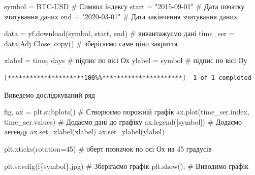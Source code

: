 \documentclass[
  letterpaper,
]{report}
\newenvironment{Shaded}{\begin{snugshade}}{\end{snugshade}}
\newcommand{\CommentTok}[1]{\textcolor[rgb]{0.37,0.37,0.37}{#1}}
\newcommand{\DecValTok}[1]{\textcolor[rgb]{0.68,0.00,0.00}{#1}}
\newcommand{\NormalTok}[1]{\textcolor[rgb]{0.00,0.23,0.31}{#1}}
\newcommand{\OperatorTok}[1]{\textcolor[rgb]{0.37,0.37,0.37}{#1}}
\newcommand{\SpecialCharTok}[1]{\textcolor[rgb]{0.37,0.37,0.37}{#1}}
\newcommand{\SpecialStringTok}[1]{\textcolor[rgb]{0.13,0.47,0.30}{#1}}
\newcommand{\StringTok}[1]{\textcolor[rgb]{0.13,0.47,0.30}{#1}}
\begin{document}
\begin{Shaded}
\begin{Highlighting}[]
\NormalTok{symbol }\OperatorTok{=} \StringTok{\textquotesingle{}BTC{-}USD\textquotesingle{}}       \CommentTok{\# Символ індексу}
\NormalTok{start }\OperatorTok{=} \StringTok{"2015{-}09{-}01"}     \CommentTok{\# Дата початку зчитування даних}
\NormalTok{end }\OperatorTok{=} \StringTok{"2020{-}03{-}01"}       \CommentTok{\# Дата закінчення зчитування даних}

\NormalTok{data }\OperatorTok{=}\NormalTok{ yf.download(symbol, start, end)  }\CommentTok{\# вивантажуємо дані}
\NormalTok{time\_ser }\OperatorTok{=}\NormalTok{ data[}\StringTok{\textquotesingle{}Adj Close\textquotesingle{}}\NormalTok{].copy()     }\CommentTok{\# зберігаємо саме ціни закриття}

\NormalTok{xlabel }\OperatorTok{=} \StringTok{\textquotesingle{}time, days\textquotesingle{}}    \CommentTok{\# підпис по вісі Ох }
\NormalTok{ylabel }\OperatorTok{=}\NormalTok{ symbol          }\CommentTok{\# підпис по вісі Оу}
\end{Highlighting}
\end{Shaded}

\begin{verbatim}
[*********************100%%**********************]  1 of 1 completed
\end{verbatim}

Виведемо досліджуваний ряд

\begin{Shaded}
\begin{Highlighting}[]
\NormalTok{fig, ax }\OperatorTok{=}\NormalTok{ plt.subplots()                   }\CommentTok{\# Створюємо порожній графік}
\NormalTok{ax.plot(time\_ser.index, time\_ser.values)   }\CommentTok{\# Додаємо дані до графіку}
\NormalTok{ax.legend([symbol])                        }\CommentTok{\# Додаємо легенду}
\NormalTok{ax.set\_xlabel(xlabel)}
\NormalTok{ax.set\_ylabel(ylabel)}

\NormalTok{plt.xticks(rotation}\OperatorTok{=}\DecValTok{45}\NormalTok{)                    }\CommentTok{\# оберт позначок по осі Ох на 45 градусів}

\NormalTok{plt.savefig(}\SpecialStringTok{f\textquotesingle{}}\SpecialCharTok{\{}\NormalTok{symbol}\SpecialCharTok{\}}\SpecialStringTok{.jpg\textquotesingle{}}\NormalTok{)               }\CommentTok{\# Зберігаємо графік }
\NormalTok{plt.show()}\OperatorTok{;}                                \CommentTok{\# Виводимо графік}
\end{Highlighting}
\end{Shaded}
\end{document}

